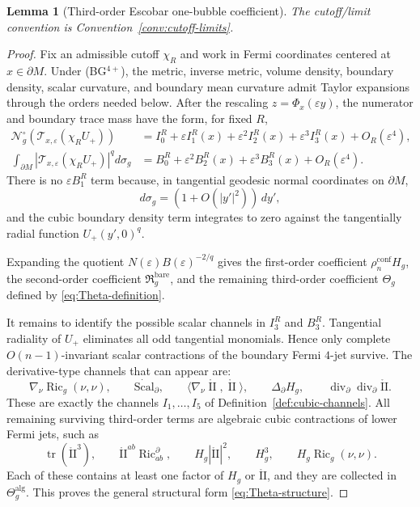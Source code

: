 \documentclass[11pt,reqno,a4paper]{amsart}
\DeclareMathOperator{\Ric}{Ric}
\DeclareMathOperator{\II}{II}
\numberwithin{equation}{section}
\theoremstyle{plain}
\newtheorem{lemma}[theorem]{Lemma}
\newcommand{\Scal}{\mathrm{Scal}}
\theoremstyle{remark}
\theoremstyle{plain}
\begin{document}
\begin{lemma}[Third-order Escobar one-bubble coefficient]
The cutoff/limit convention is Convention~\ref{conv:cutoff-limits}.
\end{lemma}

\begin{proof}
Fix an admissible cutoff $\chi_R$ and work in Fermi coordinates centered at
$x\in\partial M$.  Under \textup{(BG$^{4+}$)}, the metric, inverse metric,
volume density, boundary density, scalar curvature, and boundary mean curvature
admit Taylor expansions through the orders needed below.  After the rescaling
$z=\Phi_x(\varepsilon y)$, the numerator and boundary trace mass have the form,
for fixed $R$,
\begin{align*}
\mathcal N_g^\circ(\mathcal T_{x,\varepsilon}(\chi_RU_+))
&= I_0^R+\varepsilon I_1^R(x)+\varepsilon^2 I_2^R(x)+\varepsilon^3 I_3^R(x)
   +O_R(\varepsilon^4),\\
\int_{\partial M}|\mathcal T_{x,\varepsilon}(\chi_RU_+)|^qd\sigma_g
&= B_0^R+\varepsilon^2 B_2^R(x)+\varepsilon^3 B_3^R(x)+O_R(\varepsilon^4).
\end{align*}
There is no $\varepsilon B_1^R$ term because, in tangential geodesic normal
coordinates on $\partial M$,
\[
d\sigma_g=(1+O(|y'|^2))\,dy',
\]
and the cubic boundary density term integrates to zero against the tangentially
radial function $U_+(y',0)^q$.

Expanding the quotient $N(\varepsilon)B(\varepsilon)^{-2/q}$ gives the
first-order coefficient $\rho_n^{\mathrm{conf}}H_g$, the second-order
coefficient $\mathfrak R_g^{\mathrm{bare}}$, and the remaining third-order
coefficient $\Theta_g$ defined by \eqref{eq:Theta-definition}.

It remains to identify the possible scalar channels in $I_3^R$ and $B_3^R$.
Tangential radiality of $U_+$ eliminates all odd tangential monomials.  Hence
only complete $O(n-1)$-invariant scalar contractions of the boundary Fermi
$4$-jet survive.  The derivative-type channels that can appear are:
\[
\nabla_\nu\Ric_g(\nu,\nu),
\qquad
\dot{\Scal}_\partial,
\qquad
\langle\nabla_\nu\mathring{\II},\mathring{\II}\rangle,
\qquad
\Delta_\partial H_g,
\qquad
\operatorname{div}_\partial\operatorname{div}_\partial\mathring{\mathrm{II}}.
\]
These are exactly the channels $I_1,\ldots,I_5$ of
Definition~\ref{def:cubic-channels}.  All remaining surviving third-order
terms are algebraic cubic contractions of lower Fermi jets, such as
\[
\operatorname{tr}(\mathring{\mathrm{II}}^3),
\qquad
\mathring{\mathrm{II}}^{ab}\Ric^\partial_{ab},
\qquad
H_g|\mathring{\mathrm{II}}|^2,
\qquad
H_g^3,
\qquad
H_g\Ric_g(\nu,\nu).
\]
Each of these contains at least one factor of $H_g$ or $\mathring{\mathrm{II}}$,
and they are collected in $\Theta_g^{\mathrm{alg}}$.  This proves the general
structural form \eqref{eq:Theta-structure}.


\end{proof}
\end{document}
